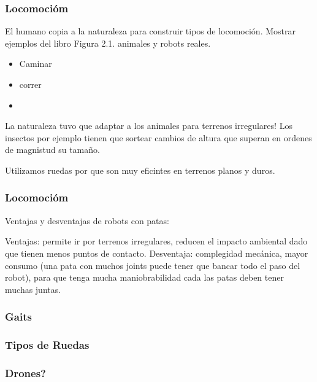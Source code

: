\begin{frame}
    \frametitle{Locomocióm}
    El humano copia a la naturaleza para construir tipos de locomoción.
    Mostrar ejemplos del libro Figura 2.1. animales y robots reales.
    
    \begin{itemize}
        \item Caminar
        \item correr
        \item
    \end{itemize}
    
    La naturaleza tuvo que adaptar a los animales para terrenos irregulares!
    Los insectos por ejemplo tienen que sortear cambios de altura que superan en ordenes de magnistud su tamaño.
    
    Utilizamos ruedas por que son muy eficintes en terrenos planos y duros.
    
\end{frame}


\begin{frame}
    \frametitle{Locomocióm}
    Ventajas y desventajas de robots con patas:
    
    Ventajas: permite ir por terrenos irregulares, reducen el impacto ambiental dado que tienen menos puntos de contacto.
    Desventaja: complegidad mecánica, mayor consumo (una pata con muchos joints puede tener que bancar todo el paso del robot), para que tenga mucha maniobrabilidad cada las patas deben tener muchas juntas.
    
\end{frame}


\begin{frame}
    \frametitle{Gaits}
    
\end{frame}


\begin{frame}
    \frametitle{Tipos de Ruedas}

\end{frame}

\begin{frame}
    \frametitle{Drones?}
    
\end{frame}